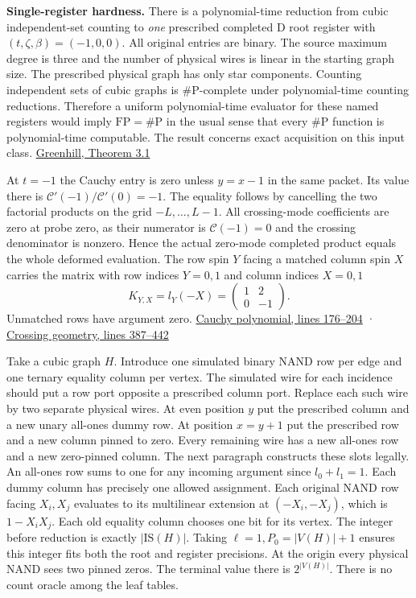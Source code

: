 \documentclass[11pt,a4paper]{article}
\begin{document}
\textbf{Single-register hardness.} There is a polynomial-time reduction
from cubic independent-set counting to \emph{one} prescribed completed D
root register with \((t,\zeta,\beta)=(-1,0,0)\). All original entries
are binary. The source maximum degree is three and the number of
physical wires is linear in the starting graph size. The prescribed
physical graph has only star components. Counting independent sets of
cubic graphs is \(\#\mathrm P\)-complete under polynomial-time counting
reductions. Therefore a uniform polynomial-time evaluator for these
named registers would imply \(\mathrm{FP}=\#\mathrm P\) in the usual
sense that every \(\#\mathrm P\) function is polynomial-time computable.
The result concerns exact acquisition on this input class.
\href{https://web.maths.unsw.edu.au/~csg/papers/complexity.pdf}{Greenhill,
Theorem 3.1}

At \(t=-1\) the Cauchy entry is zero unless \(y=x-1\) in the same
packet. Its value there is \(\mathcal C'(-1)/\mathcal C'(0)=-1\). The
equality follows by cancelling the two factorial products on the grid
\(-L,\ldots,L-1\). All crossing-mode coefficients are zero at probe
zero, as their numerator is \(\mathcal C(-1)=0\) and the crossing
denominator is nonzero. Hence the actual zero-mode completed product
equals the whole deformed evaluation. The row spin \(Y\) facing a
matched column spin \(X\) carries the matrix with row indices \(Y=0,1\)
and column indices \(X=0,1\) \[
             K_{Y,X}=l_Y(-X)=
             \begin{pmatrix}1&2\\0&-1\end{pmatrix}.
\tag{A1}
\] Unmatched rows have argument zero.
\href{https://github.com/openai/math/blob/main/preprints/The-Exponential-Time-Hypothesis-is-False-October-25-2026/build/quantitative-contraction.tex\#L176}{Cauchy
polynomial, lines 176--204} ·
\href{https://github.com/openai/math/blob/main/preprints/The-Exponential-Time-Hypothesis-is-False-October-25-2026/build/quantitative-contraction.tex\#L387}{Crossing
geometry, lines 387--442}

Take a cubic graph \(H\). Introduce one simulated binary NAND row per
edge and one ternary equality column per vertex. The simulated wire for
each incidence should put a row port opposite a prescribed column port.
Replace each such wire by two separate physical wires. At even position
\(y\) put the prescribed column and a new unary all-ones dummy row. At
position \(x=y+1\) put the prescribed row and a new column pinned to
zero. Every remaining wire has a new all-ones row and a new zero-pinned
column. The next paragraph constructs these slots legally. An all-ones
row sums to one for any incoming argument since \(l_0+l_1=1\). Each
dummy column has precisely one allowed assignment. Each original NAND
row facing \(X_i,X_j\) evaluates to its multilinear extension at
\((-X_i,-X_j)\), which is \(1-X_iX_j\). Each old equality column chooses
one bit for its vertex. The integer before reduction is exactly
\(|\mathrm{IS}(H)|\). Taking \(\ell=1, P_0=|V(H)|+1\) ensures this
integer fits both the root and register precisions. At the origin every
physical NAND sees two pinned zeros. The terminal value there is
\(2^{|V(H)|}\). There is no count oracle among the leaf tables.
\end{document}

